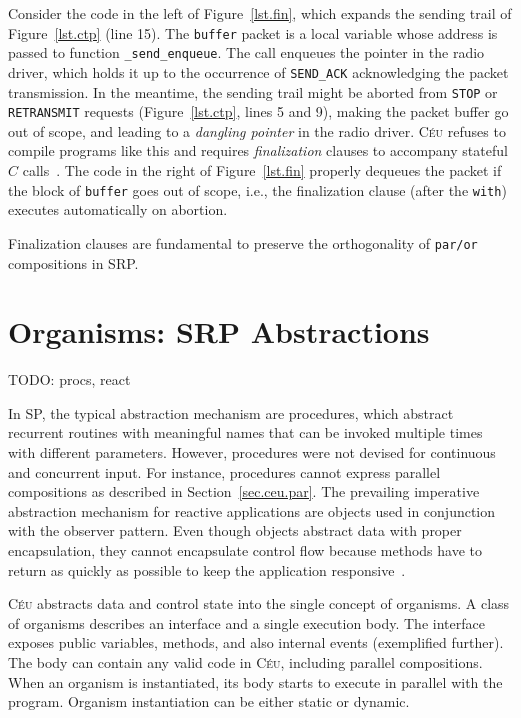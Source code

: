 \documentclass{acm_proc_article-sp}
\newcommand{\CEU}{\textsc{C\'{e}u}\xspace}
\newcommand{\code}[1] {{\small{\texttt{#1}}}}
\newcommand{\1}{\;}
\newcommand{\2}{\;\;}
\newcommand{\3}{\;\;\;}
\newcommand{\5}{\;\;\;\;\;}
\begin{document}
Consider the code in the left of Figure~\ref{lst.fin}, which expands the 
sending trail of Figure~\ref{lst.ctp} (line 15).
%
The \code{buffer} packet is a local variable whose address is passed to 
function \code{\_send\_enqueue}.
The call enqueues the pointer in the radio driver, which holds it up to the 
occurrence of \code{SEND\_ACK} acknowledging the packet transmission.
%
In the meantime, the sending trail might be aborted from \code{STOP} or 
\code{RETRANSMIT} requests (Figure~\ref{lst.ctp}, lines 5 and 9), making the 
packet buffer go out of scope, and leading to a \emph{dangling pointer} in the 
radio driver.
%
\CEU refuses to compile programs like this and requires \emph{finalization} 
clauses to accompany stateful $C$ calls~\cite{ceu.sensys13}.
The code in the right of Figure~\ref{lst.fin} properly dequeues the packet if
the block of \code{buffer} goes out of scope, i.e., the finalization clause 
(after the \code{with}) executes automatically on abortion.

Finalization clauses are fundamental to preserve the orthogonality of 
\code{par/or} compositions in SRP.

\section{Organisms: SRP Abstractions}
\label{sec.orgs}

TODO: procs, react

%
In SP, the typical abstraction mechanism are procedures, which abstract
recurrent routines with meaningful names that can be invoked multiple times 
with different parameters.
%
However, procedures were not devised for continuous and concurrent input.
For instance, procedures cannot express parallel compositions as described in 
Section~\ref{sec.ceu.par}.
%
The prevailing imperative abstraction mechanism for reactive applications are 
objects used in conjunction with the observer pattern.
Even though objects abstract data with proper encapsulation, they cannot 
encapsulate control flow because methods have to return as quickly as possible 
to keep the application responsive~\cite{TODO.games.patterns}.

\CEU abstracts data and control state into the single concept of organisms.
%
A class of organisms describes an interface and a single execution body.
The interface exposes public variables, methods, and also internal events 
(exemplified further).
The body can contain any valid code in \CEU, including parallel compositions.
When an organism is instantiated, its body starts to execute in parallel with 
the program.
Organism instantiation can be either static or dynamic.
\end{document}
